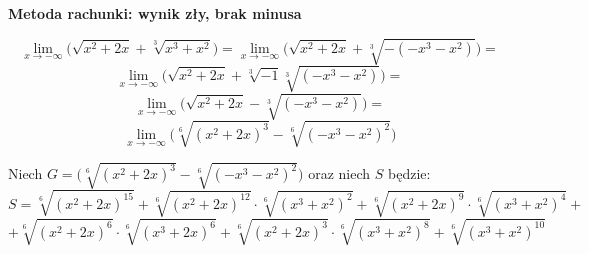 \documentclass{article}
\begin{document}
\textbf{Metoda rachunki: wynik zły, brak minusa}

\begin{equation*}
    \lim_{x \to - \infty} \Big(\sqrt{x^2 +2x} + \sqrt[3]{x^3 + x^2}\Big) = \lim_{x \to - \infty} \Big(\sqrt{x^2 + 2x} + \sqrt[3]{- (-x^3 - x^2)}\Big) = 
\end{equation*}
\begin{equation*}
    \lim_{x \to - \infty} \Big(\sqrt{x^2 + 2x} + \sqrt[3]{-1}\sqrt[3]{(-x^3 - x^2)}\Big) = 
\end{equation*}
\begin{equation*}
    \lim_{x \to - \infty} \Big(\sqrt{x^2 + 2x} - \sqrt[3]{(-x^3 - x^2)}\Big) = 
\end{equation*}
\begin{equation*}
    \lim_{x \to - \infty} \Big(\sqrt[6]{(x^2 + 2x)^{3}} - \sqrt[6]{(-x^3 - x^2)^{2}}\Big) 
\end{equation*}


Niech \(G = \Big(\sqrt[6]{(x^2 + 2x)^{3}} - \sqrt[6]{(-x^3 - x^2)^{2}}\Big)\) oraz  niech \(S\) będzie:
\begin{equation*}
    S = \sqrt[6]{(x^2 +2x)^{15}} + \sqrt[6]{(x^2 +2x)^{12}} \cdot \sqrt[6]{(x^3 + x^2)^{2}} + \sqrt[6]{(x^2 + 2x)^{9}} \cdot \sqrt[6]{(x^3 + x^2)^{4}} +
\end{equation*}
\begin{equation*}
    + \sqrt[6]{(x^2 +2x)^{6}} \cdot \sqrt[6]{(x^3 + 2x)^{6}} + \sqrt[6]{(x^2 + 2x)^{3}} \cdot \sqrt[6]{(x^3 + x^2)^{8}} + \sqrt[6]{(x^3 + x^2)^{10}}
\end{equation*}
\end{document}
